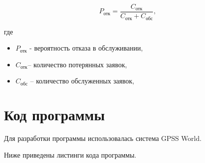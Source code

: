 \documentclass[a4paper,12pt]{article}
\begin{document}
	\begin{equation}
	P_{\text{отк}} = \frac{C_{\text{отк}}}{C_{\text{отк}} + C_{\text{обс}}},
	\end{equation}
	
	где
	\begin{itemize}
		\item $P_{\text{отк}}$ - вероятность отказа в обслуживании,
		\item $C_{\text{отк}}$– количество потерянных заявок,
		\item $C_{\text{обс}}$ – количество обслуженных заявок,
	\end{itemize}
	
	\newpage
	
	\section*{Код программы}
	
	Для разработки программы использовалась система GPSS World.
	
	Ниже приведены листинги кода программы.
	
\end{document}

